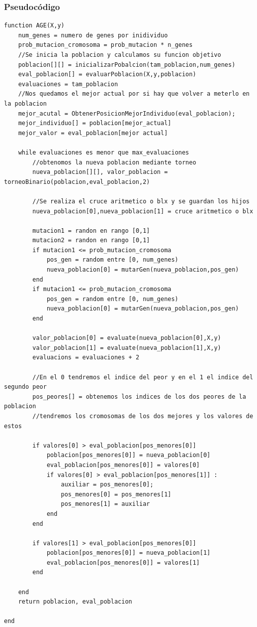 \documentclass[titlepage]{article}
\begin{document}
	\subsubsection{Pseudocódigo}
		\begin{lstlisting}
function AGE(X,y)
	num_genes = numero de genes por inidividuo
	prob_mutacion_cromosoma = prob_mutacion * n_genes
	//Se inicia la poblacion y calculamos su funcion objetivo
	poblacion[][] = inicializarPobalcion(tam_poblacion,num_genes)
	eval_poblacion[] = evaluarPoblacion(X,y,poblacion)	
	evaluaciones = tam_poblacion
	//Nos quedamos el mejor actual por si hay que volver a meterlo en la poblacion
	mejor_acutal = ObtenerPosicionMejorIndividuo(eval_poblacion);
	mejor_individuo[] = poblacion[mejor_actual]
	mejor_valor = eval_poblacion[mejor actual]
	
	while evaluaciones es menor que max_evaluaciones		
		//obtenomos la nueva poblacion mediante torneo
		nueva_poblacion[][], valor_poblacion = torneoBinario(poblacion,eval_poblacion,2)
		
		//Se realiza el cruce aritmetico o blx y se guardan los hijos
		nueva_poblacion[0],nueva_poblacion[1] = cruce aritmetico o blx
			
		mutacion1 = randon en rango [0,1]
		mutacion2 = randon en rango [0,1]	
		if mutacion1 <= prob_mutacion_cromosoma
			pos_gen = random entre [0, num_genes)
			nueva_poblacion[0] = mutarGen(nueva_poblacion,pos_gen)
		end	
		if mutacion1 <= prob_mutacion_cromosoma
			pos_gen = random entre [0, num_genes)
			nueva_poblacion[0] = mutarGen(nueva_poblacion,pos_gen)
		end
		
		valor_poblacion[0] = evaluate(nueva_poblacion[0],X,y)
		valor_poblacion[1] = evaluate(nueva_poblacion[1],X,y)
		evaluacions = evaluaciones + 2
		
		//En el 0 tendremos el indice del peor y en el 1 el indice del segundo peor		
		pos_peores[] = obtenemos los indices de los dos peores de la poblacion
		//tendremos los cromosomas de los dos mejores y los valores de estos
		
		if valores[0] > eval_poblacion[pos_menores[0]]
			poblacion[pos_menores[0]] = nueva_poblacion[0]
			eval_poblacion[pos_menores[0]] = valores[0]
			if valores[0] > eval_poblacion[pos_menores[1]] :
				auxiliar = pos_menores[0];
				pos_menores[0] = pos_menores[1]
				pos_menores[1] = auxiliar
			end
		end
		
		if valores[1] > eval_poblacion[pos_menores[0]]
			poblacion[pos_menores[0]] = nueva_poblacion[1]
			eval_poblacion[pos_menores[0]] = valores[1]
		end
	
	end
	return poblacion, eval_poblacion
	
end
	\end{lstlisting}
	
\end{document}
